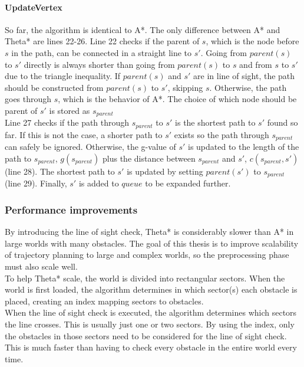 \paragraph{UpdateVertex}
So far, the algorithm is identical to A*. The only difference between A* and Theta* are lines 22-26. Line 22 checks if the parent of $s$, which is the node before $s$ in the path, can be connected in a straight line to $s'$. Going from $parent(s)$ to $s'$ directly is always shorter than going from $parent(s)$ to $s$ and from $s$ to $s'$ due to the triangle inequality. If $parent(s)$ and $s'$ are in line of sight, the path should be constructed from $parent(s)$ to $s'$, skipping $s$. Otherwise, the path goes through $s$, which is the behavior  of A*. The choice of which node should be parent of $s'$ is stored as $s_{parent}$\\
Line 27 checks if the path through $s_{parent}$ to $s'$ is the shortest path to $s'$ found so far. If this is not the case, a shorter path to $s'$ exists so the  path through $s_{parent}$ can safely be ignored. Otherwise, the g-value of $s'$ is updated to the length of the path to $s_{parent}$, $g(s_{parent})$ plus the distance between $s_{parent}$ and $s'$, $c(s_{parent},s')$ (line 28). The shortest path to $s'$ is updated by setting $parent(s')$ to $s_{parent}$ (line 29). Finally, $s'$ is added to $queue$ to be expanded further.
\subsubsection{Performance improvements}
By introducing the line of sight check, Theta* is considerably slower than A* in large worlds with many obstacles. The goal of this thesis is to improve scalability of trajectory planning to large and complex worlds, so the preprocessing phase must also scale well. \\
To help Theta* scale, the world is divided into rectangular sectors. When the world is first loaded, the algorithm determines in which sector(s) each obstacle is placed, creating an index mapping sectors to obstacles. \\
When the line of sight check is executed, the algorithm determines which sectors the line crosses. This is usually just one or two sectors. By using the index, only the obstacles in those sectors need to be considered for the line of sight check. This is much faster than having to check every obstacle in the entire world every time.



